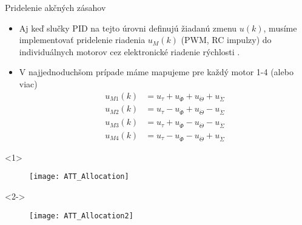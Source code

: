   \begin{frame}{Pridelenie akčných zásahov}
  \begin{itemize}
    \item<1-> Aj keď slučky PID na tejto úrovni definujú žiadanú zmenu $u(k)$, musíme implementovať pridelenie riadenia  $u_M(k)$ (PWM, RC impulzy) do individuálnych motorov cez elektronické riadenie rýchlosti .
     \item<2-> V najjednoduchšom prípade máme mapujeme pre každý motor 1-4 (alebo viac)
    \begin{align}
     u_{M1}(k) &= u_{\tau}  + u_{\dot{\Phi}} + u_{\dot{\Theta}}  + u_{\dot{\Sigma}}\\
     u_{M2}(k) &= u_{\tau}  - u_{\dot{\Phi}} + u_{\dot{\Theta}}  - u_{\dot{\Sigma}}\\
     u_{M3}(k) &= u_{\tau}  + u_{\dot{\Phi}} - u_{\dot{\Theta}}  - u_{\dot{\Sigma}}\\
     u_{M4}(k) &= u_{\tau}  - u_{\dot{\Phi}} - u_{\dot{\Theta}}  + u_{\dot{\Sigma}}
     \end{align}
\end{itemize}
    \begin{onlyenv}<1>
  \begin{figure}
\centering
  \texttt{[image: ATT\_Allocation]}\\
\end{figure}
\end{onlyenv}
    \begin{onlyenv}<2->
  \begin{figure}
\centering
  \texttt{[image: ATT\_Allocation2]}\\
\end{figure}
\end{onlyenv}
  \end{frame}

